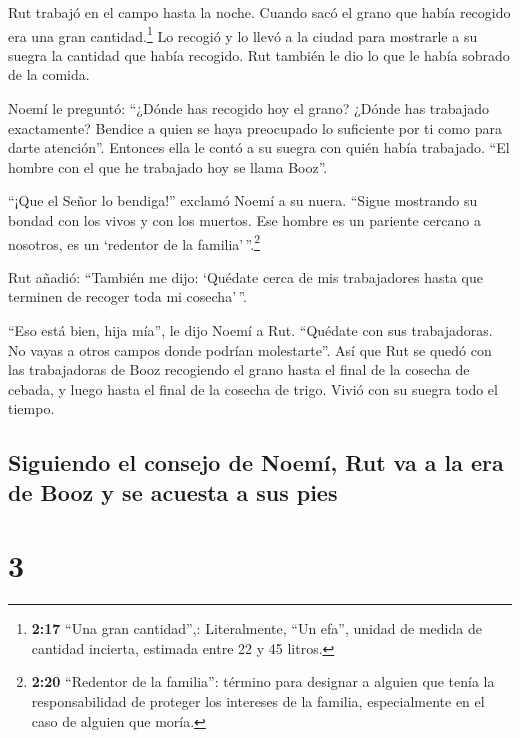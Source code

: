  Rut trabajó en el campo hasta la noche. Cuando sacó el
grano que había recogido era una gran cantidad.\footnote{\textbf{2:17}
  ``Una gran cantidad'',: Literalmente, ``Un efa'', unidad de medida de
  cantidad incierta, estimada entre 22 y 45 litros.}  Lo
recogió y lo llevó a la ciudad para mostrarle a su suegra la cantidad
que había recogido. Rut también le dio lo que le había sobrado de la
comida.

 Noemí le preguntó: ``¿Dónde has recogido hoy el grano?
¿Dónde has trabajado exactamente? Bendice a quien se haya preocupado lo
suficiente por ti como para darte atención''. Entonces ella le contó a
su suegra con quién había trabajado. ``El hombre con el que he trabajado
hoy se llama Booz''.

 ``¡Que el Señor lo bendiga!'' exclamó Noemí a su nuera.
``Sigue mostrando su bondad con los vivos y con los muertos. Ese hombre
es un pariente cercano a nosotros, es un `redentor de la
familia'\,''.\footnote{\textbf{2:20} ``Redentor de la familia'': término
  para designar a alguien que tenía la responsabilidad de proteger los
  intereses de la familia, especialmente en el caso de alguien que
  moría.}

 Rut añadió: ``También me dijo: `Quédate cerca de mis
trabajadores hasta que terminen de recoger toda mi cosecha'\,''.

 ``Eso está bien, hija mía'', le dijo Noemí a Rut.
``Quédate con sus trabajadoras. No vayas a otros campos donde podrían
molestarte''.  Así que Rut se quedó con las trabajadoras
de Booz recogiendo el grano hasta el final de la cosecha de cebada, y
luego hasta el final de la cosecha de trigo. Vivió con su suegra todo el
tiempo.

\hypertarget{siguiendo-el-consejo-de-noemuxed-rut-va-a-la-era-de-booz-y-se-acuesta-a-sus-pies}{%
\subsection{Siguiendo el consejo de Noemí, Rut va a la era de Booz y se
acuesta a sus
pies}\label{siguiendo-el-consejo-de-noemuxed-rut-va-a-la-era-de-booz-y-se-acuesta-a-sus-pies}}

\hypertarget{section-2}{%
\section{3}\label{section-2}}

